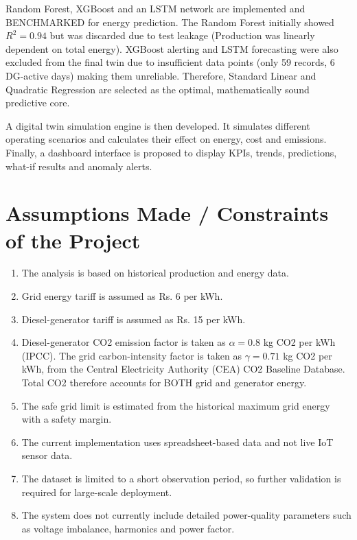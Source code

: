 Random Forest, XGBoost and an LSTM network are implemented and BENCHMARKED for energy prediction. The Random Forest initially showed $R^2 = 0.94$ but was discarded due to test leakage (Production was linearly dependent on total energy). XGBoost alerting and LSTM forecasting were also excluded from the final twin due to insufficient data points (only 59 records, 6 DG-active days) making them unreliable. Therefore, Standard Linear and Quadratic Regression are selected as the optimal, mathematically sound predictive core.

A digital twin simulation engine is then developed. It simulates different operating scenarios and calculates their effect on energy, cost and emissions. Finally, a dashboard interface is proposed to display KPIs, trends, predictions, what-if results and anomaly alerts.

\section{Assumptions Made / Constraints of the Project}
\begin{enumerate}
    \item The analysis is based on historical production and energy data.
    \item Grid energy tariff is assumed as Rs. 6 per kWh.
    \item Diesel-generator tariff is assumed as Rs. 15 per kWh.
    \item Diesel-generator CO2 emission factor is taken as $\alpha = 0.8$ kg CO2 per kWh (IPCC). The grid carbon-intensity factor is taken as $\gamma = 0.71$ kg CO2 per kWh, from the Central Electricity Authority (CEA) CO2 Baseline Database. Total CO2 therefore accounts for BOTH grid and generator energy.
    \item The safe grid limit is estimated from the historical maximum grid energy with a safety margin.
    \item The current implementation uses spreadsheet-based data and not live IoT sensor data.
    \item The dataset is limited to a short observation period, so further validation is required for large-scale deployment.
    \item The system does not currently include detailed power-quality parameters such as voltage imbalance, harmonics and power factor.
\end{enumerate}

